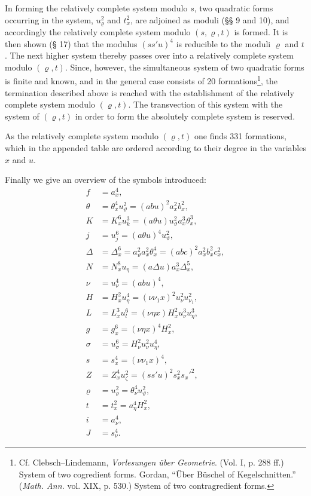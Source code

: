\documentclass[11pt]{article}
\begin{document}
In forming the relatively complete system modulo $s$, two quadratic forms occurring in the system, $u_\varrho^2$ and $t_x^2$, are adjoined as moduli (§§ 9 and 10), and accordingly the relatively complete system modulo $(s,\varrho,t)$ is formed. It is then shown (§ 17) that the modulus $(ss'u)^4$ is reducible to the moduli $\varrho$ and $t$. The next higher system thereby passes over into a relatively complete system modulo $(\varrho,t)$. Since, however, the simultaneous system of two quadratic forms is finite and known, and in the general case consists of 20 formations\footnote{Cf. Clebsch--Lindemann, \emph{Vorlesungen über Geometrie}. (Vol. I, p. 288 ff.) System of two cogredient forms. Gordan, ``Über Büschel of Kegelschnitten.'' (\emph{Math. Ann.} vol. XIX, p. 530.) System of two contragredient forms.}, the termination described above is reached with the establishment of the relatively complete system modulo $(\varrho,t)$. The transvection of this system with the system of $(\varrho,t)$ in order to form the absolutely complete system is reserved.

As the relatively complete system modulo $(\varrho,t)$ one finds 331 formations, which in the appended table are ordered according to their degree in the variables $x$ and $u$.

Finally we give an overview of the symbols introduced:
\begin{align*}
f&=a_x^4,\\
\theta&=\theta_x^4u_\vartheta^2=(abu)^2a_x^2b_x^2,\\
K&=K_x^6u_k^3=(a\theta u)u_\vartheta^2a_x^3\theta_x^3,\\
j&=u_j^6=(a\theta u)^4u_\vartheta^2,\\
\Delta&=\Delta_x^6=a_\vartheta^2a_x^2\theta_x^4=(abc)^2a_x^2b_x^2c_x^2,\\
N&=N_x^8u_\eta=(a\Delta u)a_x^3\Delta_x^5,\\
\nu&=u_\nu^4=(abu)^4,\\
H&=H_x^2u_\eta^4=(\nu\nu_1x)^2u_\nu^2u_{\nu_1}^2,\\
L&=L_x^3u_l^6=(\nu\eta x)H_x^2u_\nu^3u_\eta^3,\\
g&=g_x^6=(\nu\eta x)^4H_x^2,\\
\sigma&=u_\sigma^6=H_\nu^2u_\nu^2u_\eta^4,\\
s&=s_x^4=(\nu\nu_1x)^4,\\
Z&=Z_x^4u_\zeta^2=(ss'u)^2s_x^2s_x'^2,\\
\varrho&=u_\varrho^2=\theta_\nu^4u_\vartheta^2,\\
t&=t_x^2=a_\eta^4H_x^2,\\
i&=a_\nu^4,\\
J&=s_\nu^4.
\end{align*}
\end{document}
